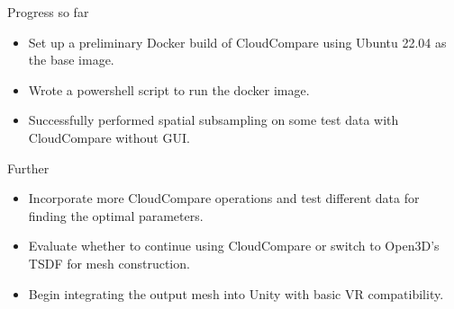 \begin{frame}{Progress so far}
    \begin{itemize}
        \item Set up a preliminary Docker build of CloudCompare using Ubuntu 22.04 as the base image.
        \item Wrote a powershell script to run the docker image.
        \item Successfully performed spatial subsampling on some test data with CloudCompare without GUI.
    \end{itemize}    
\end{frame}

\begin{frame}{Further}
    \begin{itemize}
        \item Incorporate more CloudCompare operations and test different data for finding the optimal parameters.
        \item Evaluate whether to continue using CloudCompare or switch to Open3D’s TSDF for mesh construction.
        \item Begin integrating the output mesh into Unity with basic VR compatibility.
    \end{itemize}    
\end{frame}
